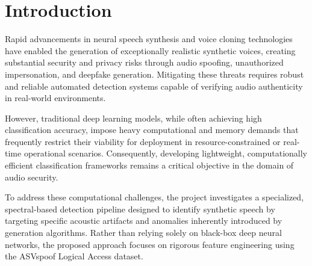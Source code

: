 \documentclass[12pt,a4paper]{report}
\begin{document}
\vspace*{-3cm}
\listoffigures
\thispagestyle{prelimpages}

\clearpage

\pagestyle{tocstyle}

\makeatletter
\let\ps@plain\ps@tocstyle
\makeatother

\vspace*{-2.5cm}
\tableofcontents
\thispagestyle{tocstyle}

\clearpage

\setcounter{page}{1}
\pagestyle{frontmatter}

\makeatletter
\let\ps@plain\ps@frontmatter
\makeatother

\chapter{Introduction}


Rapid advancements in neural speech synthesis and voice cloning technologies have enabled the generation of exceptionally realistic synthetic voices, creating substantial security and privacy risks through audio spoofing, unauthorized impersonation, and deepfake generation. Mitigating these threats requires robust and reliable automated detection systems capable of verifying audio authenticity in real-world environments. 

However, traditional deep learning models, while often achieving high classification accuracy, impose heavy computational and memory demands that frequently restrict their viability for deployment in resource-constrained or real-time operational scenarios. Consequently, developing lightweight, computationally efficient classification frameworks remains a critical objective in the domain of audio security.

To address these computational challenges, the project investigates a specialized, spectral-based detection pipeline designed to identify synthetic speech by targeting specific acoustic artifacts and anomalies inherently introduced by generation algorithms. Rather than relying solely on black-box deep neural networks, the proposed approach focuses on rigorous feature engineering using the ASVspoof Logical Access dataset. 
\end{document}
